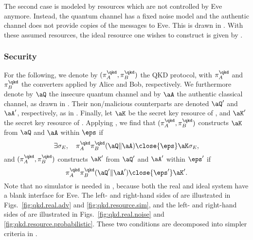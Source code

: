 The second case is modeled by resources which are not controlled by
Eve anymore. Instead, the quantum channel has a fixed noise model and
the authentic channel does not provide copies of the messages to
Eve. This is drawn in . With these assumed
resources, the ideal resource one wishes to construct is given by
.


\subsubsection{Security}
\label{sec:qkd.security}

For the following, we denote by $(\pi^\qkd_A,\pi^\qkd_B)$ the QKD
protocol, with $\pi^\qkd_A$ and $\pi^\qkd_B$ the converters applied by
Alice and Bob, respectively.  We furthermore denote by $\aQ$ the
insecure quantum channel and by $\aA$ the authentic classical channel,
as drawn in . Their non\-/malicious
counterparts are denoted $\aQ'$ and $\aA'$,
respectively, as in . Finally,
let $\aK$ be the secret key resource of
, and $\aK'$ the secret key
resource of . Applying
, we find that $(\pi_A^{\qkd},\pi_B^{\qkd})$
constructs $\aK$ from $\aQ$ and $\aA$ within
$\eps$ if 
\begin{equation} \label{eq:qkd.security}
  \exists \sigma_E, \quad \pi_A^{\qkd}\pi_B^{\qkd}(\aQ \| \aA)
  \close{\eps} \aK \sigma_E,
\end{equation}
and  $(\pi_A^{\qkd},\pi_B^{\qkd})$
constructs $\aK'$ from $\aQ'$ and $\aA'$ within
$\eps'$ if 
\begin{equation} \label{eq:qkd.robust}
  \pi_A^{\qkd}\pi_B^{\qkd}(\aQ'
  \| \aA') \close{\eps'} \aK'.
\end{equation}
Note that no simulator is needed in , because
both the real and ideal system have a blank interface for Eve.  The
left- and right-hand sides of  are illustrated
in Figs.~\ref{fig:qkd.real.adv} and \ref{fig:qkd.resource.sim}, and
the left- and right-hand sides of  are
illustrated in Figs.~\ref{fig:qkd.real.noise} and
\ref{fig:qkd.resource.probabilistic}. These two conditions are
decomposed into simpler criteria in .


